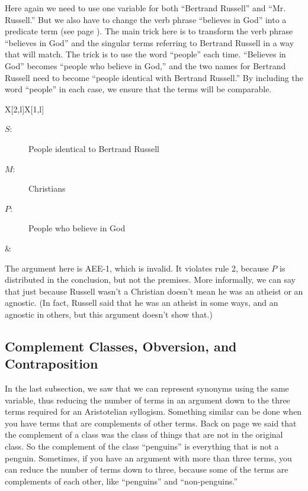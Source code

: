 Here again we need to use one variable for both ``Bertrand Russell'' and ``Mr. Russell.'' But we also have to change the verb phrase ``believes in God'' into a predicate term (see page \pageref{subsec:nonstandard_verbs}). The main trick here is to transform the verb phrase ``believes in God'' and the singular terms referring to Bertrand Russell in a way that will match. The trick is to use the word ``people'' each time. ``Believes in God'' becomes ``people who believe in God,'' and the two names for Bertrand Russell need to become ``people identical with Bertrand Russell.'' By including the word ``people'' in each case, we ensure that the terms will be comparable.

\begin{tabu}{{X[2,l]X[1,l]}}
\begin{description}
\item[$S$:] People identical to Bertrand Russell
\item[$M$:] Christians
\item[$P$:] People who believe in God
\end{description}
&
\begin{kormanize}
\end{kormanize}
\end{tabu}

The argument here is AEE-1, which is invalid. It violates rule 2, because $P$ is distributed in the conclusion, but not the premises. More informally, we can say that just because Russell wasn't a Christian doesn't mean he was an atheist or an agnostic. (In fact, Russell said that he was an atheist in some ways, and an agnostic in others, but this argument doesn't show that.)

\subsection{Complement Classes, Obversion, and Contraposition}

In the last subsection, we saw that we can represent synonyms using the same variable, thus reducing the number of terms in an argument down to the three terms required for an Aristotelian syllogism. Something similar can be done when you have terms that are complements of other terms. Back on page \pageref{def:Complement} we said that the complement of a class was the class of things that are not in the original class. So the complement of the class ``penguins'' is everything that is not a penguin. Sometimes, if you have an argument with more than three terms, you can reduce the number of terms down to three, because some of the terms are complements of each other, like ``penguins'' and ``non-penguins.''

